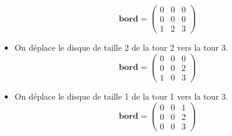 \begin{itemize}
        $$
        \mathbf{bord} = 
        \begin{pmatrix}
            0 & 0 & 0 \\
            0 & 0 & 0 \\
            1 & 2 & 3 
        \end{pmatrix}
        $$
    \item On déplace le disque de taille 2 de la tour 2 vers la tour 3.
        $$
        \mathbf{bord} = 
        \begin{pmatrix}
            0 & 0 & 0 \\
            0 & 0 & 2 \\
            1 & 0 & 3 
        \end{pmatrix}
        $$
    \item On déplace le disque de taille 1 de la tour 1 vers la tour 3.
        $$
        \mathbf{bord} = 
        \begin{pmatrix}
            0 & 0 & 1 \\
            0 & 0 & 2 \\
            0 & 0 & 3 
        \end{pmatrix}
        $$
\end{itemize}
